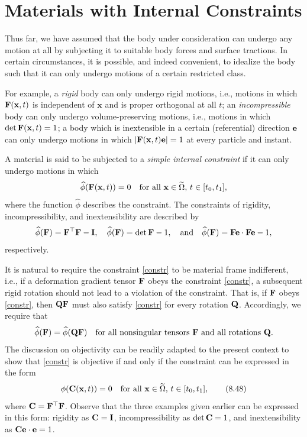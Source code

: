 \section{Materials with Internal Constraints}
Thus far, we have assumed that the body under consideration can undergo any motion at all by subjecting it to suitable body forces and surface tractions. In certain circumstances, it is possible, and indeed convenient, to idealize the body such that it can only undergo motions of a certain restricted class. 

For example, a \textit{rigid} body can only undergo rigid motions, i.e., motions in which $\mathbf{F}(\mathbf{\mathbf{x}}, t)$ is independent of $\mathbf{x}$ and is proper orthogonal at all $t$; an \textit{incompressible} body can only undergo volume-preserving motions, i.e., motions in which $\det \mathbf{F}(\mathbf{\mathbf{x}}, t) = 1$; a body which is inextensible in a certain (referential) direction $\mathbf{\mathbf{e}}$ can only undergo motions in which $|\mathbf{F}(\mathbf{x}, t)\mathbf{e}| = 1$ at every particle and instant.

A material is said to be subjected to a \textit{simple internal constraint} if it can only undergo motions in which
\begin{equation}\label{constr}
	\widehat\phi(\mathbf{F}(\mathbf{x}, t)) = 0 \quad \text{for all } \mathbf{x} \in \widetilde\Omega, \, t \in [t_0, t_1],
\end{equation}
where the function $\widehat\phi$ describes the constraint. The constraints of rigidity, incompressibility, and inextensibility are described by
\[
\widehat\phi(\mathbf{F}) = \mathbf{F}^\top \mathbf{F} - \mathbf{I}, \quad \widehat\phi(\mathbf{F}) = \det \mathbf{F} - 1, \quad \text{and} \quad \widehat\phi(\mathbf{F}) = \mathbf{F}\mathbf{\mathbf{e}} \cdot \mathbf{F}\mathbf{\mathbf{e}} - 1,
\]
respectively.

It is natural to require the constraint \eqref{constr} to be material frame indifferent, i.e., if a deformation gradient tensor $\mathbf{F}$ obeys the constraint  \eqref{constr}, a subsequent rigid rotation should not lead to a violation of the constraint. That is, if $\mathbf{F}$ obeys  \eqref{constr}, then $\mathbf{Q}\mathbf{F}$ must also satisfy  \eqref{constr} for every rotation $\mathbf{Q}$. Accordingly, we require that
\[
\widehat\phi(\mathbf{F}) = \widehat\phi(\mathbf{Q}\mathbf{F}) \quad \text{for all nonsingular tensors } \mathbf{F} \text{ and all rotations } \mathbf{Q}.
\]
The discussion on objectivity can be readily adapted to the present context to show that  \eqref{constr} is objective if and only if the constraint can be expressed in the form
\begin{equation}
	\phi(\mathbf{C}(\mathbf{\mathbf{x}}, t)) = 0 \quad \text{for all } \mathbf{x} \in \widetilde{\Omega}, \, t \in [t_0, t_1], \tag{8.48}
\end{equation}
where $\mathbf{C} = \mathbf{F}^\top \mathbf{F}$. Observe that the three examples given earlier can be expressed in this form: rigidity as $\mathbf{C} = \mathbf{I}$, incompressibility as $\det \mathbf{C} = 1$, and inextensibility as $\mathbf{C}\mathbf{e} \cdot \mathbf{e} = 1$.

